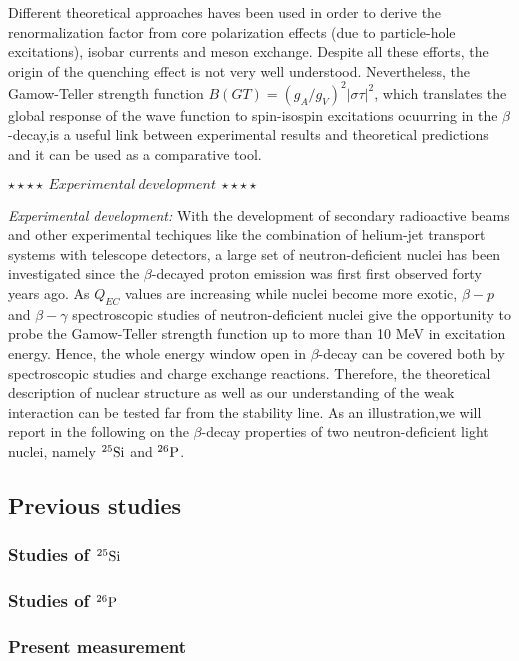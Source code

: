 \documentclass[UTF8]{ctexart}
\begin{document}
Different theoretical approaches haves been used in order to derive the renormalization factor from core polarization effects (due to particle-hole excitations), isobar currents and meson exchange. Despite all these efforts, the origin of the quenching effect is not very well understood. Nevertheless, the Gamow-Teller strength function $B(GT)=\left( g_{A}/g_{V} \right)^{2}\left| \sigma \tau  \right|^{2}$, which translates the global response of the wave function to spin-isospin excitations ocuurring in the $\beta$-decay,is a useful link between experimental results and theoretical predictions and it can be used as a comparative tool.

$\star\star\star\star~Experimental~development~\star\star\star\star$

\textit{Experimental development:} With the development of secondary radioactive beams and other experimental techiques like the combination of helium-jet transport systems with telescope detectors, a large set of neutron-deficient nuclei has been investigated since the $\beta$-decayed proton emission was first first observed forty years ago. As $Q_{EC}$ values are increasing while nuclei become more exotic, $\beta-p$ and $\beta-\gamma$ spectroscopic studies of neutron-deficient nuclei give the opportunity to probe the Gamow-Teller strength function up to more than 10 MeV in excitation energy. Hence, the whole energy window open in $\beta$-decay can be covered both by spectroscopic studies and charge exchange reactions. Therefore, the theoretical description of nuclear structure as well as our understanding of the weak interaction can be tested far from the stability line. As an illustration,we will report in the following on the $\beta$-decay properties of two neutron-deficient light nuclei, namely $^{25}\textnormal{Si}$ and $^{26}\textnormal{P}$.

\subsection{Previous studies}
\subsubsection{Studies of $^{25}\textnormal{Si}$}
\subsubsection{Studies of $^{26}\textnormal{P}$}
\subsubsection{Present measurement}
\end{document}
